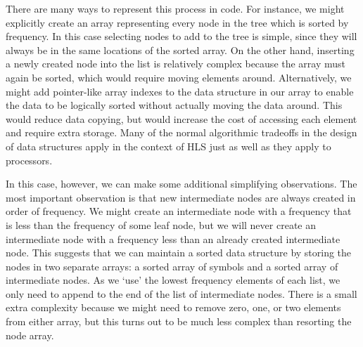 There are many ways to represent this process in code.  For instance, we might explicitly create an array representing every node in the tree which is sorted by frequency.  In this case selecting nodes to add to the tree is simple, since they will always be in the same locations of the sorted array.  On the other hand, inserting a newly created node into the list is relatively complex because the array must again be sorted, which would require moving elements around.  Alternatively, we might add pointer-like array indexes to the data structure in our array to enable the data to be logically sorted without actually moving the data around.  This would reduce data copying, but would increase the cost of accessing each element and require extra storage.  Many of the normal algorithmic tradeoffs in the design of data structures apply in the context of HLS just as well as they apply to processors.

In this case, however, we can make some additional simplifying observations.  The most important observation is that new intermediate nodes are always created in order of frequency.  We might create an intermediate node with a frequency that is less than the frequency of some leaf node, but we will never create an intermediate node with a frequency less than an already created intermediate node.  This suggests that we can maintain a sorted data structure by storing the nodes in two separate arrays: a sorted array of symbols and a sorted array of intermediate nodes.  As we `use' the lowest frequency elements of each list, we only need to append to the end of the list of intermediate nodes.  There is a small extra complexity because we might need to remove zero, one, or two elements from either array, but this turns out to be much less complex than resorting the node array.

